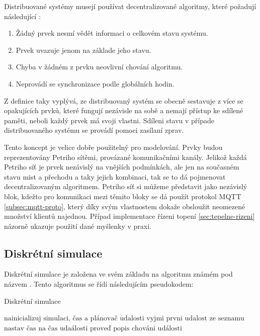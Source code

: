 Distribuované systémy musejí používat decentralizované algoritmy, které požadují následující \cite[p.20]{distributed_systems}:
\begin{enumerate}
  \item Žádný prvek nesmí vědět informaci o celkovém stavu systému.
  \item Prvek uvazuje jenom na základe jeho stavu.
  \item Chyba v žádném z prvku neovlivní chování algoritmu.
  \item Neprovádí se synchronizace podle globálních hodin.
\end{enumerate}

Z definice taky vyplývá, ze distribuovaný systém se obecně sestavuje z více se opakujících prvků, které fungují nezávisle na sobě a nemají přístup ke sdílené paměti, neboli každý prvek má svoji vlastni. Sdíleni stavu v případe distribuovaného systému se provádí pomoci zasílaní zprav.

Tento koncept je velice dobře použitelný pro modelování. Prvky budou reprezentovány Petriho sítěmi, provázané komunikačními kanály. Jelikož každá Petriho síť je prvek nezávislý na vnějších podmínkách, ale jen na současném stavu mist a přechodu a taky jejich kombinaci, tak se to dá pojmenovat decentralizovaným algoritmem. Petriho síť si můžeme představit jako nezávislý blok, kdežto pro komunikaci mezi těmito bloky se dá použít protokol MQTT \ref{subsec:mqtt-proto}, který díky svým vlastnostem dokaže obsloužit neomezené množství klientů najednou. Případ implementace řízeni topení \ref{sec:tepelne-rizeni} názorně ukazuje použití dané myšlenky v praxi.

\subsection{Diskrétní simulace}
\label{subsec:disc-sim}

Diskrétní simulace je založena ve svém základu na algoritmu známém pod názvem . Tento algoritmus se řídí následujícím pseudokodem:
\begin{algorithm}
 \caption{Diskrétní simulace}\label{disc-sim-alg}
 \begin{algorithmic}[1]
 \State $\text{nainicializuj simulaci, čas a plánovač udalosti}$
 \State $\text{vyjmi prvni udalost ze seznamu}$
   \Return
 \EndIf
 \State $\text{nastav čas na čas udaálosti}$
 \State $\text{proveď popis chováni události}$
 \EndWhile
 \end{algorithmic}
\end{algorithm}

